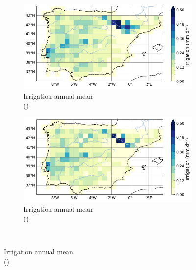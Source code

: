 \begin{figure}[htbp]
    \centering
    \begin{subfigure}[b]{0.48\textwidth}
        \caption{Irrigation annual mean\\(\std)}
        \includegraphics[width=\textwidth]{images/chap3/maps/irrigation_subgrid.png}
    \end{subfigure}
    \begin{subfigure}[b]{0.48\textwidth}
        \caption{Irrigation annual mean\\(\native)}
        \includegraphics[width=\textwidth]{images/chap3/maps/irrigation_interp.png}
    \end{subfigure} \\
    

\end{figure}
